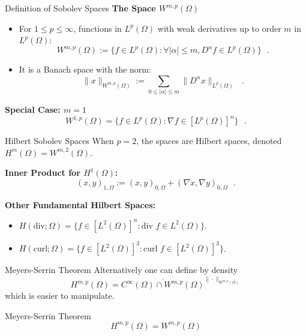 \documentclass[aspectratio=169]{beamer}
\begin{document}
\begin{frame}{Definition of Sobolev Spaces}
    \textbf{The Space $W^{m,p}(\Omega)$}
    \begin{itemize}
        \item For $1 \le p \le \infty$, functions in $L^p(\Omega)$ with weak derivatives up to order $m$ in $L^p(\Omega)$:
        \[
            W^{m,p}(\Omega) := \{ f \in L^p(\Omega) : \forall |\alpha| \le m, D^\alpha f \in L^p(\Omega) \} \text{ }.
        \]
        \item It is a Banach space with the norm:
        \[
            \|x\|_{W^{m,p}(\Omega)} := \sum_{0 \le |\alpha| \le m} \|D^\alpha x\|_{L^p(\Omega)} \text{ }.
        \]
    \end{itemize}
    
    \vspace{0.3cm}
    \textbf{Special Case: $m=1$}
    \[
        W^{1,p}(\Omega) = \{ f \in L^p(\Omega) : \nabla f \in [L^p(\Omega)]^n \} \text{ }.
    \]
\end{frame}

\begin{frame}{Hilbert Sobolev Spaces}
    When $p=2$, the spaces are Hilbert spaces, denoted $H^m(\Omega) = W^{m,2}(\Omega)$.
    
    \vspace{0.3cm}
    \textbf{Inner Product for $H^1(\Omega)$:}
    \[
        (x, y)_{1,\Omega} := (x, y)_{0,\Omega} + (\nabla x, \nabla y)_{0,\Omega} \text{ }.
    \]
    
    \vspace{0.3cm}
    \textbf{Other Fundamental Hilbert Spaces:}
    \begin{itemize}
        \item $H(\text{div}; \Omega) = \{ f \in [L^2(\Omega)]^n : \text{div } f \in L^2(\Omega) \}$.
        \item $H(\text{curl}; \Omega) = \{ f \in [L^2(\Omega)]^3 : \text{curl } f \in [L^2(\Omega)]^3 \}$.
    \end{itemize}
\end{frame}

\begin{frame}{Meyers-Serrin Theorem}
    Alternatively one can define by density
    $$ H^{m,p}(\Omega) = \overline{C^\infty(\Omega)\cap W^{m,p}(\Omega)}^{\|\cdot\|_{W^{m,p}(\Omega)}}$$
    which is easier to manipulate.
    \pause
    \begin{block}{Meyers-Serrin Theorem}
        $$H^{m,p}(\Omega) = W^{m,p}(\Omega) $$
    \end{block}
\end{frame}
\end{document}
